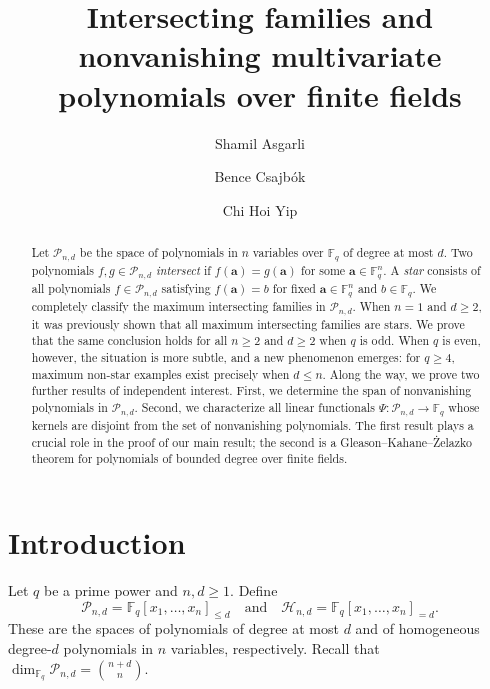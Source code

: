 \documentclass[12pt,reqno]{amsart}
\title{Intersecting families and nonvanishing multivariate polynomials over finite fields}
\author{Shamil Asgarli}
\author{Bence Csajb\'{o}k}
\author{Chi Hoi Yip}
\theoremstyle{definition}
\newcommand{\F}{\mathbb{F}}
\newcommand{\cH}{\mathcal H}
\newcommand{\cP}{\mathcal P}
\begin{document}
\begin{abstract}
Let $\mathcal{P}_{n,d}$ be the space of polynomials in $n$ variables over
$\mathbb{F}_q$ of degree at most $d$. Two polynomials
$f,g\in\mathcal{P}_{n,d}$ \emph{intersect} if
$f(\mathbf a)=g(\mathbf a)$ for some $\mathbf a\in\mathbb{F}_q^n$. A \emph{star} consists of all polynomials $f\in\mathcal{P}_{n,d}$ satisfying $f(\mathbf a)=b$ for fixed $\mathbf a\in\mathbb{F}_q^n$ and $b\in\mathbb{F}_q$. We completely classify the maximum intersecting families in $\mathcal{P}_{n,d}$. When $n=1$ and $d\geq 2$, it was previously shown that all maximum intersecting families are stars. We prove that the same conclusion holds for all $n\geq 2$ and $d\geq 2$ when $q$ is odd. When $q$ is even, however, the situation is more subtle, and a new phenomenon emerges: for $q\geq 4$, maximum non-star examples exist precisely when $d\leq n$. Along the way, we prove two further results of independent interest. First, we determine the span of nonvanishing polynomials in $\mathcal{P}_{n,d}$. Second, we characterize all linear functionals $\Psi\colon\mathcal{P}_{n,d}\to\mathbb{F}_q$ whose kernels are disjoint from the set of nonvanishing polynomials. The first result plays a crucial role in the proof of our main result; the second is a Gleason--Kahane--\.{Z}elazko theorem for polynomials of bounded degree over finite fields.
\end{abstract}

\maketitle


\section{Introduction}

Let $q$ be a prime power and $n,d\geq 1$. Define
\[
\cP_{n,d}=\F_q[x_1,\ldots,x_n]_{\leq d} \quad \text{and} \quad \cH_{n,d}=\F_q[x_1,\ldots,x_n]_{=d}.
\]
These are the spaces of polynomials of degree at most $d$ and of homogeneous degree-$d$ polynomials in $n$ variables, respectively. Recall that $\dim_{\F_q}\cP_{n,d}=\binom{n+d}{n}$.
\end{document}
